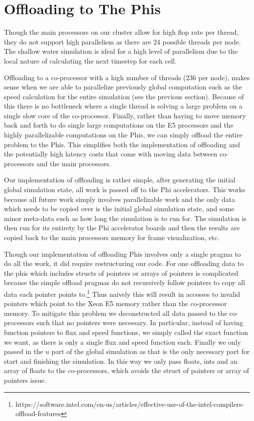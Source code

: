 \section{Offloading to The Phis}

Though the main processors on our cluster allow for high flop rate per thread, they do not support high parallelism as there are 24 possible threads per node. The shallow water simulation is ideal for a high level of parallelism due to the local nature of calculating the next timestep for each cell.

Offloading to a co-processor with a high number of threads (236 per node), makes sense when we are able to parallelize previously global computation such as the speed calculation for the entire simulation (see the previous section). Because of this there is no bottleneck where a single thread is solving a large problem on a single slow core of the co-processor. Finally, rather than having to move memory back and forth to do single large computations on the E5 processors and the highly parallelizable computations on the Phis, we can simply offload the entire problem to the Phis. This simplifies both the implementation of offloading and the potentially high latency costs that come with moving data between co-processors and the main processors.

Our implementation of offloading is rather simple, after generating the initial global simulation state, all work is passed off to the Phi accelerators. This works because all future work simply involves parallelizable work and the only data which needs to be copied over is the initial global simulation state, and some minor meta-data such as how long the simulation is to run for. The simulation is then run for its entirety by the Phi accelerator boards and then the results are copied back to the main processors memory for frame visualization, etc.

Though our implementation of offloading Phis involves only a single pragma to do all the work, it did require restructuring our code. For one offloading data to the phis which includes structs of pointers or arrays of pointers is complicated because the simple offload pragmas do not recursively follow pointers to copy all data each pointer points to.\footnote{https://software.intel.com/en-us/articles/effective-use-of-the-intel-compilers-offload-features} Thus naively this will result in accesses to invalid pointers which point to the Xeon E5 memory rather than the co-processor memory. To mitigate this problem we deconstructed all data passed to the co-processors such that no pointers were necessary. In particular, instead of having function pointers to flux and speed functions, we simply called the exact function we want, as there is only a single flux and speed function each. Finally we only passed in the $u$ part of the global simulation as that is the only necessary part for start and finishing the simulation. In this way we only pass floats, ints and an array of floats to the co-processors, which avoids the struct of pointers or array of pointers issue.

